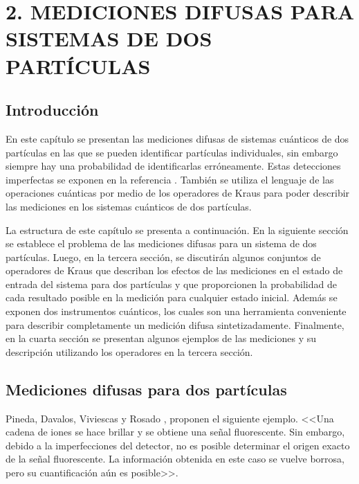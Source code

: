 \chapter[MEDICIONES DIFUSAS PARA SISTEMA DE DOS PARTÍCULAS]{2. MEDICIONES DIFUSAS PARA SISTEMAS DE DOS PARTÍCULAS}

\section{Introducción}
 En este capítulo se presentan las mediciones difusas de sistemas cuánticos de
dos partículas en las que se pueden identificar partículas individuales, sin embargo siempre hay una
probabilidad de identificarlas erróneamente. Estas detecciones imperfectas se
exponen en la referencia {\cite{Pineda_2021}}. También se utiliza el lenguaje
de las operaciones cuánticas por medio de los operadores de Kraus para poder
describir las mediciones en los sistemas cuánticos de dos partículas.

La estructura de este capítulo se presenta a continuación. En la siguiente sección se establece el problema de las mediciones difusas para un sistema de dos partículas. Luego, en la tercera sección, se discutirán algunos conjuntos de operadores de Kraus que describan los efectos de las mediciones en el estado de entrada del sistema para dos partículas y que proporcionen la probabilidad de cada resultado posible en la medición para cualquier estado inicial.  Además se exponen dos instrumentos cuánticos, los cuales son una herramienta conveniente para describir completamente un medición difusa sintetizadamente. Finalmente, en la cuarta sección se presentan algunos ejemplos de las mediciones y su descripción utilizando los operadores en la tercera sección.

\section{Mediciones difusas para dos partículas} %

Pineda, Davalos, Viviescas y Rosado {\cite{Pineda_2021}}, proponen el siguiente
ejemplo. <<Una cadena de iones se hace brillar  y se obtiene una señal
fluorescente. Sin embargo, debido a la imperfecciones del detector, no es
posible determinar el origen exacto de la señal fluorescente. La
información obtenida en este caso se vuelve borrosa, pero su cuantificación aún
es posible>>.

